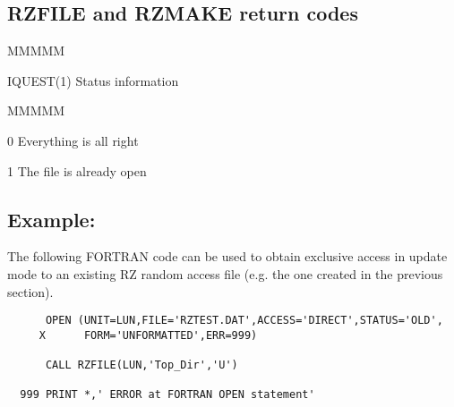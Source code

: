 \subsection{RZFILE and RZMAKE return codes}
\begin{DL}{MMMMM}
\item[IQUEST(1)
]Status information
\begin{DL}{MMMMM}
\item[ 0
]Everything is all right
\item[ 1
]The file is already open
\end{DL}
\end{DL}
\subsection{Example:}
\par The following FORTRAN code can be used
to obtain exclusive access in update mode
to an existing RZ random access file (e.g. the one created in the
previous section).
\begin{verbatim}
      OPEN (UNIT=LUN,FILE='RZTEST.DAT',ACCESS='DIRECT',STATUS='OLD',
     X      FORM='UNFORMATTED',ERR=999)
 
      CALL RZFILE(LUN,'Top_Dir','U')
 
  999 PRINT *,' ERROR at FORTRAN OPEN statement'
\end{verbatim}
